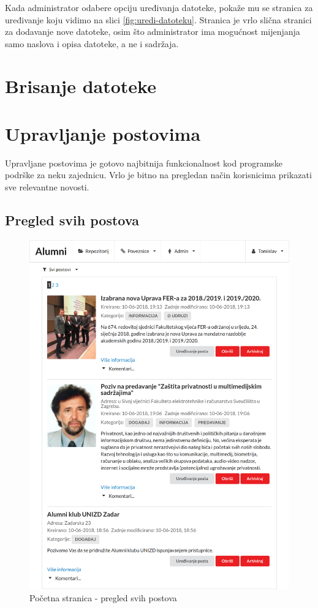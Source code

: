 \documentclass[zavrsni, numeric]{fer}
\begin{document}
Kada administrator odabere opciju uređivanja datoteke, pokaže mu se stranica za uređivanje koju vidimo na slici \ref{fig:uredi-datoteku}. Stranica je vrlo slična stranici za dodavanje nove datoteke, osim što administrator ima mogućnost mijenjanja samo naslova i opisa datoteke, a ne i sadržaja.

\section{Brisanje datoteke}

\section{Upravljanje postovima}
Upravljane postovima je gotovo najbitnija funkcionalnost kod programske podrške za neku zajednicu. Vrlo je bitno na pregledan način korisnicima prikazati sve relevantne novosti.

\subsection{Pregled svih postova}

\begin{figure}[H]
	\centering
	\includegraphics[width=13cm]{slike/postovi.png}
	\caption{Početna stranica - pregled svih postova}
	\label{fig:postovi}
\end{figure}
\end{document}
